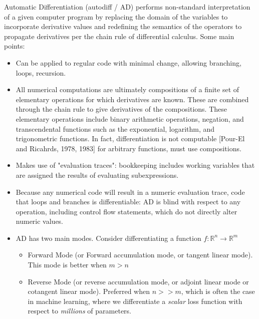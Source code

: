 \documentclass[11pt]{article}
\theoremstyle{definition}
\theoremstyle{plain}
\renewcommand{\b}[1]{\mathbb{#1}}
\begin{document}
\noindent Automatic Differentiation (autodiff / AD) 
performs non-standard interpretation of a given computer program
by replacing the domain of the variables to incorporate derivative values
and redefining the semantics of the operators to propagate derivatives
per the chain rule of differential calculus. Some main points:

\begin{itemize}

\item Can be applied to regular code with minimal change,
allowing branching, loops, recursion. 

\item All numerical computations are ultimately
compositions of a finite set of elementary operations for which derivatives are known.
These are combined through the chain rule to give derivatives of the compositions.
These elementary operations include binary arithmetic operations, negation,
and transcendental functions such as the exponential, logarithm, and trigonometric functions.
In fact, differentiation is not computable [Pour-El and Ricahrds, 1978, 1983] for
arbitrary functions, must use compositions.

\item Makes use of "evaluation traces": bookkeeping includes working variables that are assigned
the results of evaluating subexpressions. 

\item Because any numerical code will result in a numeric evaluation trace, 
code that loops and branches is differentiable: AD is blind with respect to any 
operation, including control flow statements, which do not directly alter numeric values.

\item AD has two main modes. Consider differentiating a function 
$f: \b{R}^n \rightarrow \b{R}^m$
    \begin{itemize}
        \item Forward Mode (or Forward
        accumulation mode, or tangent linear mode).
        This mode is better when $m > n$     

        \item Reverse Mode (or reverse accumulation mode,
        or adjoint linear mode or cotangent linear mode).
        Preferred when $n >> m$, which is often
        the case in machine learning, where we differentiate a \textit{scalar} 
        loss function with respect to \textit{millions} of parameters.
    \end{itemize}
\end{itemize}
\end{document}
